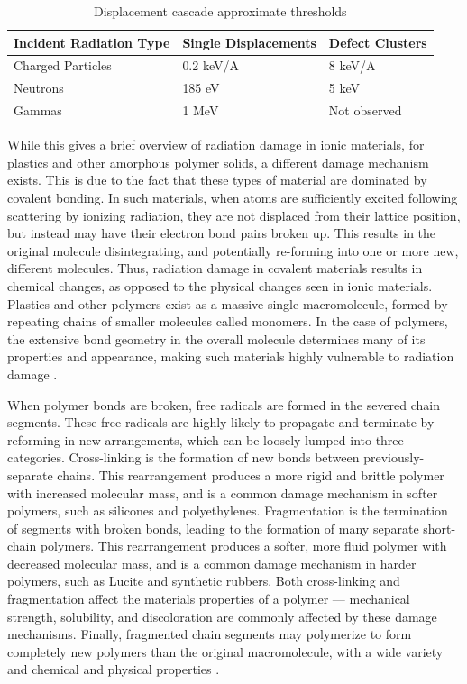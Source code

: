 \begin{table}
\centering
\caption{Displacement cascade approximate thresholds \cite{Moll2000}}
\label{tab:cascade_thresholds}
\begin{tabular}{@{}lll@{}}
\toprule
Incident Radiation Type & Single Displacements & Defect Clusters \\ \midrule
Charged Particles       & 0.2 keV/A            & 8 keV/A         \\
Neutrons                & 185 eV               & 5 keV           \\
Gammas                  & 1 MeV                & Not observed    \\ \bottomrule
\end{tabular}
\end{table}



While this gives a brief overview of radiation damage in ionic materials, for plastics and other amorphous polymer solids, a different damage  mechanism exists.
This is due to the fact that these types of material are dominated by covalent bonding.
In such materials, when atoms are sufficiently excited following scattering by ionizing radiation,  they are not displaced from their lattice position, but instead may have their electron bond pairs broken up.
This results in the original molecule  disintegrating, and potentially re-forming into one or more new, different molecules.
Thus, radiation damage in covalent materials results in chemical changes, as opposed to the physical changes seen in ionic materials.
Plastics and other polymers exist as a massive single macromolecule, formed by repeating chains of smaller molecules called monomers.
In the case of polymers, the extensive bond geometry in the overall molecule determines many of its properties and appearance, making such materials highly vulnerable to radiation damage \cite{Aframian1974}.




When polymer bonds are broken, free radicals are formed in the severed chain segments.
These free radicals are highly likely to propagate and terminate by reforming in new arrangements, which can be loosely lumped into three categories.
Cross-linking is the formation of new bonds between previously-separate chains.
This rearrangement produces a more rigid and brittle polymer with increased molecular mass, and is a common damage mechanism in softer polymers, such as silicones and polyethylenes.
Fragmentation is the termination of segments with broken bonds, leading to the formation of many separate short-chain polymers.
This rearrangement produces a softer, more fluid polymer with decreased molecular mass, and is a common damage mechanism in harder polymers, such as Lucite and synthetic rubbers.
Both cross-linking and fragmentation affect the materials properties of a polymer --- mechanical strength, solubility, and discoloration are commonly affected by these damage mechanisms. 
Finally, fragmented chain segments may polymerize to form completely new polymers than the original macromolecule, with a wide variety and chemical and physical properties \cite{Reichmanis1993}.


